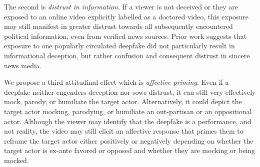 The second is \emph{distrust in information}. If a viewer is not
deceived or they are exposed to an online video explicitly labelled as
a doctored video, this exposure may still manifest in greater distrust
towards all subsequently encountered political information, even from
verified news sources. Prior work suggests that exposure to one
popularly circulated deepfake did not particularly result in
informational deception, but rather confusion and consequent distrust
in sincere news media.

We propose a third attitudinal effect which is \emph{affective
  priming}. Even if a deepfake neither engenders deception nor sows
distrust, it can still very effectively mock, parody, or humiliate the
target actor. Alternatively, it could depict the target actor mocking,
parodying, or humiliate an out-partisan or an oppositional
actor. Although the viewer may identify that the deepfake is a
performance, and not reality, the video may still elicit an affective
response that primes them to reframe the target actor either
positively or negatively depending on whether the target actor is
ex-ante favored or opposed and whether they are mocking or being
mocked.
